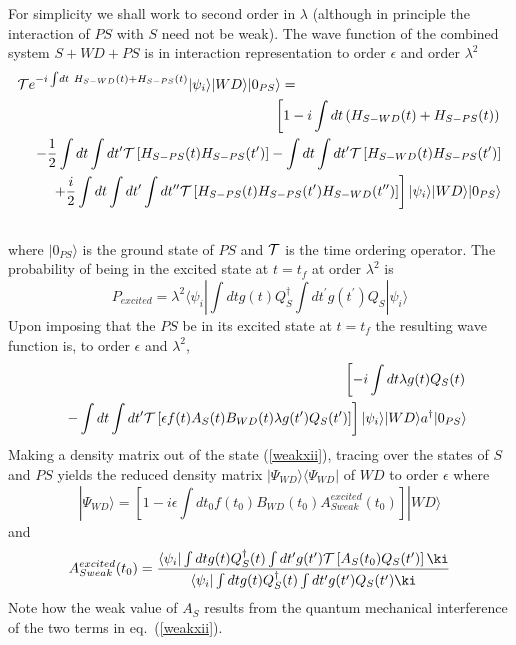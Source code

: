 \documentclass[12pt,oneside]{report}
\def\ket#1{|#1\rangle}
\def\bra#1{\langle #1|}
\def\la{\lambda}
\def\p {\prime}
\newcommand{\bi}{\mbox{$ \bra{\psi_i} $}}
\begin{document}
For simplicity we shall work to second order in $\la$ (although in principle
the interaction of $PS$ with $S$ need not be weak).
The wave function of the combined system $S+WD+PS$ is in interaction
representation to order $\epsilon$ and order $\lambda^2$
\begin{eqnarray}
\lefteqn{{\cal T} e^{-i \int\! dt \ H_{S-WD}(t) + H_{S-PS}(t)}
\ket{\psi_i}\ket{WD}\ket{0_{PS}}=}\nonumber\\
& & \left[
1 -i \int dt \left( H_{S-WD}(t) + H_{S-PS}(t) \right)\right.
\nonumber\\
& & \ -{1 \over 2}
\int dt \int dt^\prime
{\cal T}\left[ H_{S-PS}(t)  H_{S-PS}(t^\prime) \right]
-
\int dt \int dt^\prime
{\cal T}\left[ H_{S-WD}(t)  H_{S-PS}(t^\prime) \right]
\nonumber\\
& & \left.\ 
+{i \over 2}
\int dt \int dt^\prime\int dt^{\prime\prime}
{\cal T}\left[ H_{S-PS}(t)  H_{S-PS}(t^\prime) 
 H_{S-WD}(t^{\prime\prime})\right]
\right]
\ket{\psi_i}\ket{WD}\ket{0_{PS}}\nonumber\\
& \strut & \label{weakxi}
\end{eqnarray}
where $\ket{0_{PS}}$ is the ground state of $PS$ and ${\cal T}$ is
the time ordering operator. 
The probability of being in the excited state at $t=t_f$ at order $\la^2$ is
\begin{equation}
P_{excited}
= \la^2  \bra{\psi_i} \int dt g(t) Q^\dagger_S
\int dt^\p g(t^\p) Q_S \ket{\psi_i} 
\end{equation}
Upon imposing that the
$PS$ be in its excited state at $t=t_f$ the
resulting
wave function  is, to order $\epsilon$ and $\la^2$,
\begin{eqnarray}
&&\quad \left [
-i \int dt \la g(t) Q_S(t)  \right.
\nonumber\\
&& \left. -
\int dt \int dt^\prime
{\cal T}
\left[\epsilon f(t) A_S(t) B_{WD}(t) \la g(t^\prime) Q_S(t^\prime)
\right]
\right]
\ket{\psi_i}\ket{WD}a^\dagger\ket{0_{PS}}\nonumber\\
\label{weakxii}\end{eqnarray}
Making a density matrix out of the state (\ref{weakxii}), 
tracing over the states of $S$ and $PS$
yields the reduced density matrix $\ket{\Psi_{WD}}\bra{\Psi_{WD}}$ of $WD$ to
order $\epsilon$ where
\begin{equation}
\ket{\Psi_{WD}}=\left[
1 - i \epsilon \int dt_0 f(t_0) B_{WD}(t_0)
A_{S weak}^{excited}(t_0) \right] \ket{WD}
\label{weakxiii}
\end{equation}
and
\begin{equation} A_{S weak}^{excited}(t_0) =
{ \bi \int dt g(t) Q_S^\dagger (t)  \int dt^\p
g(t^\p) {\cal T } \left[ A_S(t_0) Q_S(t^\p) \right]
\ki \over \bi \int dt g(t) Q_S^\dagger (t) \int
dt^\p g(t^\p) Q_S(t^\p) \ki} \label{weakxiv} \end{equation}
Note how the weak value of $A_S$ results from the quantum mechanical
interference of the two terms in eq.~(\ref{weakxii}). 
\end{document}

